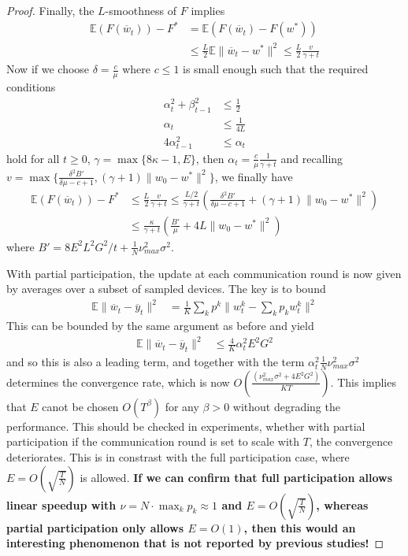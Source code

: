 \begin{proof}
	Finally, the $L$-smoothness of $F$ implies 
	\begin{align*}
	\mathbb{E}(F(\overline{w}_{t}))-F^{\ast} & =\mathbb{E}(F(\overline{w}_{t})-F(w^{\ast}))\\
	& \leq\frac{L}{2}\mathbb{E}\|\overline{w}_{t}-w^{\ast}\|^{2}\leq\frac{L}{2}\frac{v}{\gamma+t}
	\end{align*}
	Now if we choose $\delta=\frac{c}{\mu}$ where $c\leq1$ is small
	enough such that the required conditions 
	\begin{align*}
	\alpha_{t}^{2}+\beta_{t-1}^{2} & \leq\frac{1}{2}\\
	\alpha_{t} & \leq\frac{1}{4L}\\
	4\alpha_{t-1}^{2} & \leq\alpha_{t}
	\end{align*}
	hold for all $t\geq0$, $\gamma=\max\{8\kappa-1,E\}$, then $\alpha_{t}=\frac{c}{\mu}\frac{1}{\gamma+t}$
	and recalling $v=\max\{\frac{\delta^{2}B'}{\delta\mu-c+1},(\gamma+1)\|w_{0}-w^{\ast}\|^{2}\}$,
	we finally have 
	\begin{align*}
	\mathbb{E}(F(\overline{w}_{t}))-F^{\ast} & \leq\frac{L}{2}\frac{v}{\gamma+t}\leq\frac{L/2}{\gamma+t}(\frac{\delta^{2}B'}{\delta\mu-c+1}+(\gamma+1)\|w_{0}-w^{\ast}\|^{2})\\
	& \leq\frac{\kappa}{\gamma+t}(\frac{B'}{\mu}+4L\|w_{0}-w^{\ast}\|^{2})
	\end{align*}
	where $B'=8E^{2}L^{2}G^{2}/t+\frac{1}{N}\nu_{max}^{2}\sigma^{2}$. 
	
	With partial participation, the update at each communication round
	is now given by averages over a subset of sampled devices. The key
	is to bound 
	\begin{align*}
	\mathbb{E}\|\overline{w}_{t}-\overline{y}_{t}\|^{2} & =\frac{1}{K}\sum_{k}p^{k}\|w_{t}^{k}-\sum_{k}p_{k}w_{t}^{k}\|^{2}
	\end{align*}
	This can be bounded by the same argument as before and yield 
	\begin{align*}
	\mathbb{E}\|\overline{w}_{t}-\overline{y}_{t}\|^{2} & \leq\frac{4}{K}\alpha_{t}^{2}E^{2}G^{2}
	\end{align*}
	and so this is also a leading term, and together with the term $\alpha_{t}^{2}\frac{1}{N}\nu_{max}^{2}\sigma^{2}$
	determines the convergence rate, which is now $O(\frac{(\nu_{max}^{2}\sigma^{2}+4E^{2}G^{2})}{KT})$.
	This implies that $E$ canot be chosen $O(T^{\beta})$ for any $\beta>0$
	without degrading the performance. This should be checked in experiments,
	whether with partial participation if the communication round is set
	to scale with $T$, the convergence deteriorates. This is in constrast
	with the full participation case, where $E=O(\sqrt{\frac{T}{N}})$
	is allowed. \textbf{If we can confirm that full participation allows
		linear speedup with $\nu=N\cdot\max_{k}p_{k}\approx1$ and $E=O(\sqrt{\frac{T}{N}})$,
		whereas partial participation only allows $E=O(1)$, then this would
		an interesting phenomenon that is not reported by previous studies!}
\end{proof}